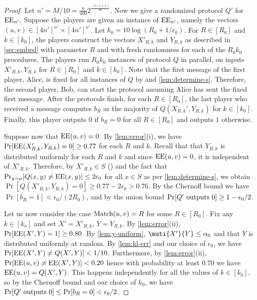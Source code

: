 \begin{proof}
Let $n' = M/10 = \frac{n}{400}2^{\frac{-5(c+1)}{4n}}$. Now we
give a randomized protocol $Q'$ for $\operatorname{EE}_{n'}$. Suppose the
players are given an instance of $\operatorname{EE}_{n'}$, namely the vectors
$(u,v)\in[4n']^{n'}\times[4n']^{n'}$. Let $k_0 = 10\log (R_0 +
1/\epsilon_0)$. For $R\in[R_0]$ and $k\in [k_0]$, the players
construct the vectors $X'_{R,k}$ and $Y_{R,k}$ as described in
\autoref{sec:embed} with parameter $R$ and with fresh randomness
for each of the $R_0k_0$ procedures. The players run $R_0 k_0$
instances of protocol $Q$ in parallel, on inputs $X'_{R,k},
Y_{R,k}$ for $R\in[R_0]$ and $k\in[k_0]$. Note that the first
message of the first player, Alice, is fixed for all instances
of $Q$ by  and \autoref{lem:determine-s}.
Therefore, the second player, Bob, can start the protocol
assuming Alice has sent the fixed first message. After the
protocols finish, for each $R\in[R_0]$, the last player who
received a message computes $b_R$ as the majority of
$Q(X_{R,k}',Y_{R,k})$ for $k\in [k_0]$. Finally, this player
outputs $0$ if $b_R=0$ for all $R\in[R_0]$ and outputs $1$
otherwise.

Suppose now that $\operatorname{EE}(u,v) = 0$. By \autoref{lem:error}(i), we
have $\Pr[\operatorname{EE}(X'_{R,k},Y_{R,k}) = 0] \ge 0.77$ for each $R$ and
$k$. Recall that that $Y_{R,k}$ is distributed uniformly for
each $R$ and $k$ and since $\operatorname{EE}(u,v)=0$, it is independent of
$X'_{R,k}$. Therefore, by $X'_{R,k}\in S$ () and
the fact that $\Pr_{y\sim \mu}[Q(x,y)\neq\operatorname{EE}(x,y)]\leq
2\epsilon_0$ for all $x\in S$ as per \autoref{lem:determine-s},
we obtain $\Pr[Q(X'_{R,k},Y_{R,k}) = 0] \ge 0.77 - 2\epsilon_0 >
0.76$. By the Chernoff bound we have $\Pr[b_R = 1] <
\epsilon_0/(2R_0)$, and by the union bound $\Pr[Q'\hbox{ outputs
}0]\ge1-\epsilon_0 /2$.

Let us now consider the case $\operatorname{Match}(u,v) = R$ for some
$R\in[R_0]$. Fix any $k\in[k_o]$ and set $X'=X'_{R,k}$,
$Y=Y_{R,k}$. By \autoref{lem:error}(ii), $\Pr[\operatorname{EE}(X',Y) = 1]\ge
0.80$. By \autoref{lem:y-uniform}, $\muti{X'}{Y}\leq \alpha_0$ 
and that $Y$ is distributed uniformly at random.
By \autoref{lem:kl-err} and our choice of $\epsilon_0$, we
have $\Pr[\operatorname{EE}(X', Y)\neq Q(X', Y)] < 1/10$. Furthermore, by
\autoref{lem:error}(ii), $\Pr[\operatorname{EE}(u,v) \neq \operatorname{EE}(X', Y)]< 0.20$
hence with probability at least $0.70$ we have $\operatorname{EE}(u,v) = Q(X',
Y)$. This happens independently for all the values of
$k\in[k_0]$, so by the Chernoff bound and our choice of $k_0$,
we have $\Pr[Q'\hbox{ outputs }0]\le\Pr[b_R = 0] < \epsilon_0 /
2$.


\end{proof}
